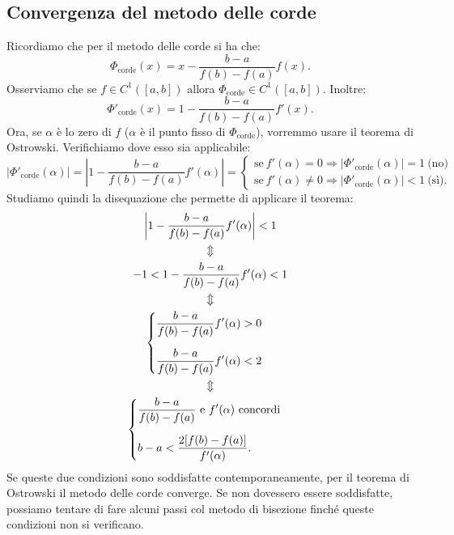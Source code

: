 \subsection{Convergenza del metodo delle corde}
Ricordiamo che per il metodo delle corde si ha che:
\begin{equation*}
\Phi _{\text{corde}}(x) =x-\frac{b-a}{f(b)-f(a)} f(x).
\end{equation*}
Osserviamo che se $f\in C^{1}([ a,b]) $ allora $ \Phi _{\text{corde}} \in C^{1}([ a,b])$. Inoltre:
\begin{equation*}
\Phi '_{\text{corde}}(x) =1-\frac{b-a}{f(b)-f(a)} f'(x).
\end{equation*}
Ora, se $\alpha $ è lo zero di $f$ ($\alpha $ è il punto fisso di $\Phi _{\text{corde}}$), vorremmo usare il teorema di Ostrowski.
Verifichiamo dove esso sia applicabile:
\begin{equation*}
| \Phi '_{\text{corde}}( \alpha )| =\left| 1-\frac{b-a}{f(b)-f(a)} f'( \alpha )\right| =\begin{cases}
\text{se} \ f'( \alpha ) =0\Rightarrow | \Phi '_{\text{corde}}( \alpha )| =1\ \text{(no)}\\
\text{se} \ f'( \alpha ) \neq 0\Rightarrow | \Phi '_{\text{corde}}( \alpha )| < 1\ \text{(sì)}.
\end{cases}
\end{equation*}
Studiamo quindi la disequazione che permette di applicare il teorema:
\begin{gather*}
\left| 1-\frac{b-a}{f(b)-f(a)} f'( \alpha )\right| < 1 \\
\Updownarrow\\
  -1< 1-\frac{b-a}{f(b)-f(a)} f'( \alpha ) < 1\\
 \Updownarrow\\
 \begin{cases}
\displaystyle\frac{b-a}{f(b)-f(a)} f'( \alpha )  >0 \vspace*{1em}\\
\displaystyle\frac{b-a}{f(b)-f(a)} f'( \alpha ) < 2
\end{cases}\\
 \Updownarrow\\
 \begin{cases}
\displaystyle\frac{b-a}{f(b)-f(a)} \ \text{e} \ f'( \alpha ) \ \text{concordi}\vspace*{1em}\\
\displaystyle b-a< \frac{2[ f(b)-f(a)]}{f'( \alpha )}.
\end{cases}
\end{gather*}
Se queste due condizioni sono soddisfatte contemporaneamente, per il teorema di Ostrowski il metodo delle corde converge. Se non dovessero essere soddisfatte, possiamo tentare di fare alcuni passi col metodo di bisezione finché queste condizioni non si verificano.

